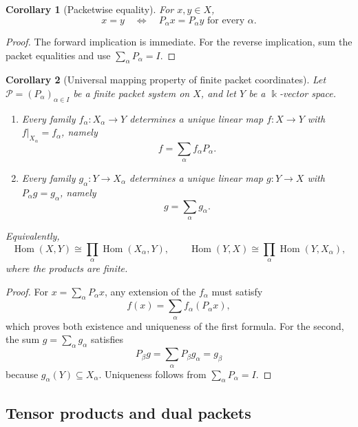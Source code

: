 \documentclass[11pt]{article}
\newtheorem{corollary}[corollary]{Corollary}
\theoremstyle{definition}
\theoremstyle{remark}
\theoremstyle{definition}\newtheorem{example}[theorem]{Example}
\newcommand{\bbk}{\Bbbk}
\newcommand{\Pcal}{\mathcal P}
\newcommand{\Hom}{\operatorname{Hom}}
\newcommand{\RecordID}[1]{\label{record:#1}}
\newcommand{\Depends}[1]{}
\newcommand{\Exports}[1]{}
\begin{document}
\begin{corollary}[Packetwise equality]
\label{cor:packetwise-equality}
For $x,y\in X$,
\[
x=y
\quad\Longleftrightarrow\quad
P_\alpha x=P_\alpha y\text{ for every }\alpha.
\]
\end{corollary}
\RecordID{PSC-I-C-PACKETWISE-EQUALITY}
\Depends{PSC-I-T-EXACT-PACKET-COORDINATES.}

\begin{proof}
The forward implication is immediate.  For the reverse implication, sum the packet equalities and use $\sum_\alpha P_\alpha=I$.
\end{proof}



\begin{corollary}[Universal mapping property of finite packet coordinates]
\label{cor:packet-universal-property}
Let \(\Pcal=(P_\alpha)_{\alpha\in I}\) be a finite packet system on \(X\), and let \(Y\) be a \(\bbk\)-vector space.
\begin{enumerate}
\item Every family \(f_\alpha:X_\alpha\to Y\) determines a unique linear map \(f:X\to Y\) with \(f|_{X_\alpha}=f_\alpha\), namely
\[
f=\sum_\alpha f_\alpha P_\alpha.
\]
\item Every family \(g_\alpha:Y\to X_\alpha\) determines a unique linear map \(g:Y\to X\) with \(P_\alpha g=g_\alpha\), namely
\[
g=\sum_\alpha g_\alpha.
\]
\end{enumerate}
Equivalently,
\[
\Hom(X,Y)\cong\prod_\alpha\Hom(X_\alpha,Y),
\qquad
\Hom(Y,X)\cong\prod_\alpha\Hom(Y,X_\alpha),
\]
where the products are finite.
\end{corollary}
\RecordID{PSC-I-C-PACKET-UNIVERSAL-PROPERTY}
\Depends{PSC-I-T-EXACT-PACKET-COORDINATES.}
\Exports{Assembly of packetwise operators, channels, corrections, and local transport data.}

\begin{proof}
For \(x=\sum_\alpha P_\alpha x\), any extension of the \(f_\alpha\) must satisfy
\[
f(x)=\sum_\alpha f_\alpha(P_\alpha x),
\]
which proves both existence and uniqueness of the first formula.  For the second, the sum \(g=\sum_\alpha g_\alpha\) satisfies
\[
P_\beta g
=\sum_\alpha P_\beta g_\alpha
=g_\beta
\]
because \(g_\alpha(Y)\subseteq X_\alpha\).  Uniqueness follows from \(\sum_\alpha P_\alpha=I\).
\end{proof}


\subsection{Tensor products and dual packets}
\end{document}
